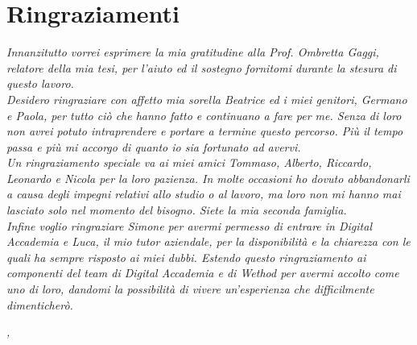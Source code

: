 
\cleardoublepage
{}
{}

\begingroup
\let\clearpage\relax
\let\cleardoublepage\relax
\let\cleardoublepage\relax

\chapter*{Ringraziamenti}

\noindent \textit{Innanzitutto vorrei esprimere la mia gratitudine alla Prof. Ombretta Gaggi, relatore della mia tesi, per l'aiuto ed il sostegno fornitomi durante la stesura di questo lavoro.}\\

\noindent \textit{Desidero ringraziare con affetto mia sorella Beatrice ed i miei genitori, Germano e Paola, per tutto ciò che hanno fatto e continuano a fare per me. Senza di loro non avrei potuto intraprendere e portare a termine questo percorso. Più il tempo passa e più mi accorgo di quanto io sia fortunato ad avervi.}\\

\noindent \textit{Un ringraziamento speciale va ai miei amici Tommaso, Alberto, Riccardo, Leonardo e Nicola per la loro pazienza. In molte occasioni ho dovuto abbandonarli a causa degli impegni relativi allo studio o al lavoro, ma loro non mi hanno mai lasciato solo nel momento del bisogno. Siete la mia seconda famiglia.}\\

\noindent \textit{Infine voglio ringraziare Simone per avermi permesso di entrare in Digital Accademia e Luca, il mio tutor aziendale, per la disponibilità e la chiarezza con le quali ha sempre risposto ai miei dubbi. Estendo questo ringraziamento ai componenti del team di Digital Accademia e di Wethod per avermi accolto come uno di loro, dandomi la possibilità di vivere un'esperienza che difficilmente dimenticherò.}\\
\bigskip

\noindent\textit{\myLocation, \myTime}
\hfill \textit{\myName}

\endgroup

